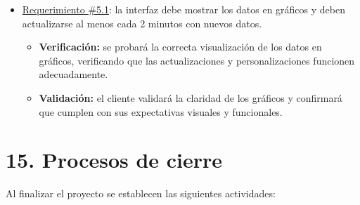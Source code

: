 \documentclass[
11pt, %
]{charter}
\begin{document}
\begin{itemize}
	\item \underline{Requerimiento \#5.1}: la interfaz debe mostrar los datos en gráficos y deben actualizarse al menos cada 2 minutos con nuevos datos.
		\begin{itemize}
			\item \textbf{Verificación:} se probará la correcta visualización de los datos en gráficos, verificando que las actualizaciones y personalizaciones funcionen adecuadamente.
			\item \textbf{Validación:} el cliente validará la claridad de los gráficos y confirmará que cumplen con sus expectativas visuales y funcionales.
		\end{itemize}

\end{itemize}

\section{15. Procesos de cierre}    
\label{sec:cierre}

Al finalizar el proyecto se establecen las siguientes actividades:
\end{document}
